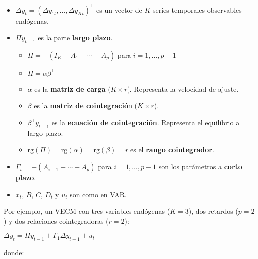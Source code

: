 \documentclass[10pt, a4paper, landscape]{article}
\newcommand{\tr}{\mathsf{T}}
\newcommand{\rk}{\mathrm{rg}}
\begin{document}
\begin{multicols}{2}
		\begin{itemize}[leftmargin=*]
			\item $\Delta y_{t} = (\Delta y_{1t}, \ldots, \Delta y_{Kt})^{\tr}$ es un vector de $K$ series temporales observables endógenas.
			\item $\Pi y_{t - 1}$ es la parte \textbf{largo plazo}.
			\begin{itemize}[leftmargin=*, label={$\diamond$}]
				\item $\Pi = - (I_{K} - A_{1} - \cdots - A_{p})$ para $i = 1, \ldots, p - 1$
				\item $\Pi = \alpha \beta^{\tr}$
				\item $\alpha$ es la \textbf{matriz de carga} ($K \times r$). Representa la velocidad de ajuste.
				\item $\beta$ es la \textbf{matriz de cointegración} ($K \times r$).
				\item $\beta^{\tr} y_{t - 1}$ es la \textbf{ecuación de cointegración}. Representa el equilibrio a largo plazo.
				\item $\rk(\Pi) = \rk(\alpha) = \rk(\beta) = r$ es el \textbf{rango cointegrador}.
			\end{itemize}
			\item $\Gamma_{i} = - (A_{i + 1} + \cdots + A_{p})$ para $i = 1, \ldots, p - 1$ son los parámetros a \textbf{corto plazo}.
			\item $x_{t}$, $B$, $C$, $D_{t}$ y $u_{t}$ son como en VAR.
		\end{itemize}
		
		Por ejemplo, un VECM con tres variables endógenas ($K = 3$), dos retardos ($p = 2$) y dos relaciones cointegradoras ($r = 2$):
		
		\begin{center}
			$\Delta y_{t} = \Pi y_{t - 1} + \Gamma_{1} \Delta y_{t - 1} + u_{t}$
		\end{center}
		
		\quad donde:
		

\end{multicols}
\end{document}

